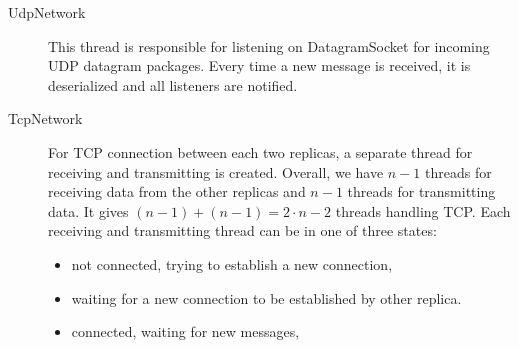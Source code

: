 \begin{description}
  \item[UdpNetwork] \hfill

    This thread is responsible for listening on DatagramSocket for incoming UDP datagram packages. Every time a new message is received, it is deserialized and all listeners are notified.

  \item[TcpNetwork] \hfill

    For TCP connection between each two replicas, a separate thread for receiving and transmitting is created. Overall, we have $n-1$ threads for receiving data from the other replicas and $n-1$ threads for transmitting data. It gives $(n - 1) + (n - 1) = 2 \cdot n - 2$ threads handling TCP. Each receiving and transmitting thread can be in one of three states:
    \begin{itemize}
            \item not connected, trying to establish a new connection,
            \item waiting for a new connection to be established by other replica.
            \item connected, waiting for new messages,
    \end{itemize}
\end{description}
